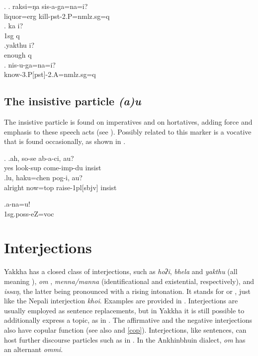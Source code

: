 	\ex. \ag.  raksi=ŋa  sis-a-ga=na=i? \\
		liquor{\sc =erg} kill{\sc [3sg.A]-pst-2.P=nmlz.sg=q}\\
		\bg. ka i? \\
		{\sc 1sg} {\sc q}\\
		\rede{I?}
		\bg.yakthu i?\\
		enough {\sc q}\\
		 \source{36\_cvs\_06.248 }
\bg. nis-u-ga=na=i?\\
	know{\sc -3.P[pst]-2.A=nmlz.sg=q}\\
 
 
 
\subsection{The insistive particle \emph{(a)u}}  

The insistive particle is found on imperatives and on hortatives, adding force and emphasis to these speech acts (see \Next). 
Possibly related to this marker is a  vocative that is found occasionally, as shown in \NNext. 

\ex. \ag.ah,    so-se           ab-a-ci,              au?\\
yes look{\sc -sup} come{\sc -imp-du} {\sc insist}\\
 
\bg.lu,     haku=chen   pog-i,         au?\\
alright now{\sc =top} raise{\sc -1pl[sbjv]} {\sc insist}\\
 

 
 \exg.a-na=u!\\
 {\sc 1sg.poss-}eZ=voc\\



\section{Interjections}\label{interjections}
 
 
 Yakkha has a closed class of interjections, such as \emph{hoʔi}, \emph{bhela} and \emph{yakthu} (all meaning ), \emph{om} , \emph{menna/manna}  (identificational and existential, respectively), and \emph{issaŋ}, the latter being pronounced with a rising intonation. It stands for   or , just like the Nepali interjection \emph{khoi}. Examples are provided in \Next. Interjections are usually employed as sentence replacements, but in Yakkha it is still possible to additionally  express a topic, as in \Next[a]. The affirmative and the negative interjections also have copular function (see also  and \ref{cop}). Interjections, like sentences, can host further discourse particles such as in \Next[d]. In the Ankhinbhuin dialect, \emph{om} has an alternant \emph{ommi}. 
 
